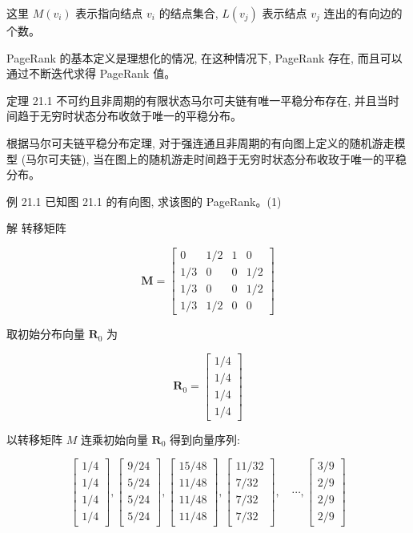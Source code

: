 \documentclass[10pt]{article}
\begin{document}
\begin{CJK*}{UTF8}{bsmi}
这里 $M\left(v_{i}\right)$ 表示指向结点 $v_{i}$ 的结点集合, $L\left(v_{j}\right)$ 表示结点 $v_{j}$ 连出的有向边的个数。

PageRank 的基本定义是理想化的情况, 在这种情况下, PageRank 存在, 而且可以通过不断迭代求得 PageRank 值。

定理 21.1 不可约且非周期的有限状态马尔可夫链有唯一平稳分布存在, 并且当时间趋于无穷时状态分布收敛于唯一的平稳分布。

根据马尔可夫链平稳分布定理, 对于强连通且非周期的有向图上定义的随机游走模\\
型 (马尔可夫链), 当在图上的随机游走时间趋于无穷时状态分布收玫于唯一的平稳分布。

例 21.1 已知图 21.1 的有向图, 求该图的 PageRank。(1)

解 转移矩阵

$$
\boldsymbol{M}=\left[\begin{array}{cccc}
0 & 1 / 2 & 1 & 0 \\
1 / 3 & 0 & 0 & 1 / 2 \\
1 / 3 & 0 & 0 & 1 / 2 \\
1 / 3 & 1 / 2 & 0 & 0
\end{array}\right]
$$

取初始分布向量 $\boldsymbol{R}_{0}$ 为

$$
\boldsymbol{R}_{0}=\left[\begin{array}{c}
1 / 4 \\
1 / 4 \\
1 / 4 \\
1 / 4
\end{array}\right]
$$

以转移矩阵 $M$ 连乘初始向量 $\boldsymbol{R}_{0}$ 得到向量序列:

$$
\left[\begin{array}{l}
1 / 4 \\
1 / 4 \\
1 / 4 \\
1 / 4
\end{array}\right],\left[\begin{array}{l}
9 / 24 \\
5 / 24 \\
5 / 24 \\
5 / 24
\end{array}\right],\left[\begin{array}{l}
15 / 48 \\
11 / 48 \\
11 / 48 \\
11 / 48
\end{array}\right],\left[\begin{array}{c}
11 / 32 \\
7 / 32 \\
7 / 32 \\
7 / 32
\end{array}\right], \quad \cdots,\left[\begin{array}{c}
3 / 9 \\
2 / 9 \\
2 / 9 \\
2 / 9
\end{array}\right]
$$


\end{CJK*}
\end{document}
